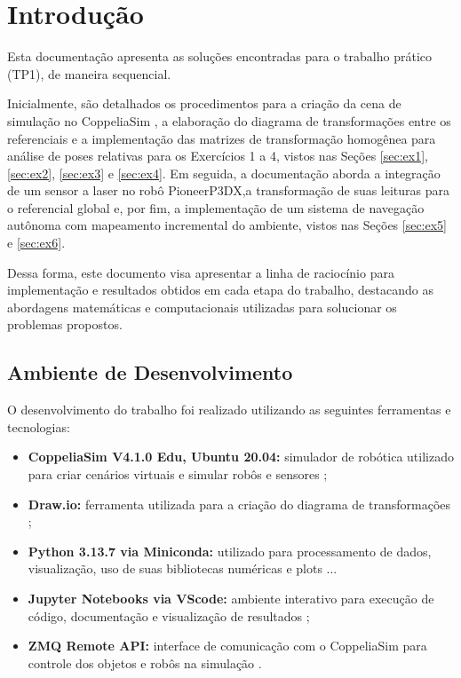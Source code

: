 \documentclass[
	12pt,				%
	oneside, %
	a4paper,			%
	english,			%
	french,				%
	spanish,			%
	brazil				%
	]{abntex2}
\begin{document}
\chapter[Introdução]{Introdução}
\label{introducao_cap}

Esta documentação apresenta as soluções encontradas para o trabalho prático (TP1), de maneira sequencial. 

Inicialmente, são detalhados os procedimentos para a criação da cena de simulação no CoppeliaSim \cite{coppeliasim}, a elaboração do diagrama de transformações entre os referenciais e a implementação das matrizes de transformação homogênea para análise de poses relativas para os Exercícios 1 a 4, vistos nas Seções \ref{sec:ex1}, \ref{sec:ex2}, \ref{sec:ex3} e \ref{sec:ex4}. Em seguida, a documentação aborda a integração de um sensor a laser no robô PioneerP3DX,a transformação de suas leituras para o referencial global e, por fim, a implementação de um sistema de navegação autônoma com mapeamento incremental do ambiente, vistos nas Seções \ref{sec:ex5} e \ref{sec:ex6}. 

Dessa forma, este documento visa apresentar a linha de raciocínio para implementação e resultados obtidos em cada etapa do trabalho, destacando as abordagens matemáticas e computacionais utilizadas para solucionar os problemas propostos.

\section{Ambiente de Desenvolvimento} \label{subsec:ambiente}

O desenvolvimento do trabalho foi realizado utilizando as seguintes ferramentas e tecnologias:

\begin{itemize}
    \item \textbf{CoppeliaSim V4.1.0 Edu, Ubuntu 20.04:} simulador de robótica utilizado para criar cenários virtuais e simular robôs e sensores \cite{coppeliasim};
    \item \textbf{Draw.io:} ferramenta utilizada para a criação do diagrama de transformações \cite{diagrams_net};
    \item \textbf{Python 3.13.7 via Miniconda:} utilizado para processamento de dados, visualização, uso de suas bibliotecas numéricas e plots \cite{anaconda_miniconda_doc}...
    \item \textbf{Jupyter Notebooks via VScode:} ambiente interativo para execução de código, documentação e visualização de resultados \cite{microsoft_vscode};
    \item \textbf{ZMQ Remote API:} interface de comunicação com o CoppeliaSim para controle dos objetos e robôs na simulação \cite{hintjens2013zeromq}.
\end{itemize}
\end{document}
